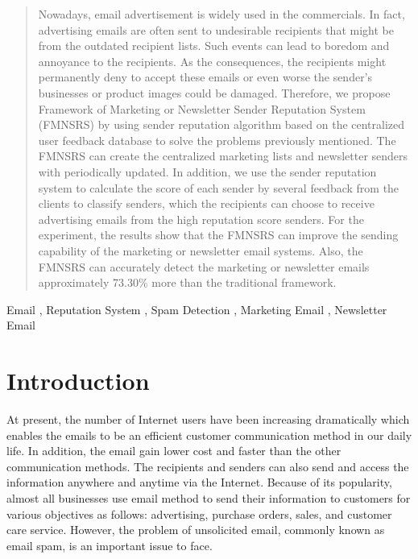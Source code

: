 \documentclass[conference]{IEEEtran}
\begin{document}
\maketitle


\begin{abstract}
%
Nowadays, email advertisement is widely used in the commercials. 
%
In fact, advertising emails are often sent to undesirable recipients that might be from the outdated recipient lists. 
%
Such events can lead to boredom and annoyance to the recipients. 
%
As the consequences, the recipients might permanently deny to accept these emails or even worse the sender's businesses or product images could be damaged.
% 
Therefore, we propose Framework of Marketing or Newsletter Sender Reputation System (FMNSRS) by using sender reputation algorithm based on the centralized user feedback database to solve the problems previously mentioned. 
%
The FMNSRS can create the centralized marketing lists and newsletter senders with periodically updated. 
%
In addition, we use the sender reputation system to calculate the score of each sender by several feedback from the clients to classify senders, which the recipients can choose to receive advertising emails from the high reputation score senders. 
% 
For the experiment, the results show that the FMNSRS can improve the sending capability of the marketing or newsletter email systems.
% 
Also, the FMNSRS can accurately detect the marketing or newsletter emails approximately 73.30\% more than the traditional framework.
\end{abstract}

\begin{IEEEkeywords}
Email , Reputation System , Spam Detection , Marketing Email , Newsletter Email
\end{IEEEkeywords}

\IEEEpeerreviewmaketitle



\section{Introduction}

At present, the number of Internet users have been increasing dramatically which enables the emails to be an efficient customer communication method in our daily life.
%
In addition, the email gain lower cost and faster than the other communication methods. 
%
The recipients and senders can also send and access the information anywhere and anytime via the Internet.
%
Because of its popularity, almost all businesses use email method to send their information to customers for various objectives as follows: advertising, purchase orders, sales, and customer care service.
%
However, the problem of unsolicited email, commonly known as email spam, is an important issue to face.
\end{document}
